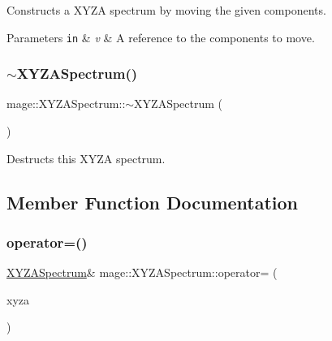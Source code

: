 Constructs a X\+Y\+ZA spectrum by moving the given components.


\begin{DoxyParams}[1]{Parameters}
\mbox{\tt in}  & {\em v} & A reference to the components to move. \\
\hline
\end{DoxyParams}
\hypertarget{structmage_1_1_x_y_z_a_spectrum_ac50d94c9756b6e8c1ff611dc37fbcfbf}{}\label{structmage_1_1_x_y_z_a_spectrum_ac50d94c9756b6e8c1ff611dc37fbcfbf} 
\subsubsection{\texorpdfstring{$\sim$\+X\+Y\+Z\+A\+Spectrum()}{~XYZASpectrum()}}
{\footnotesize\ttfamily mage\+::\+X\+Y\+Z\+A\+Spectrum\+::$\sim$\+X\+Y\+Z\+A\+Spectrum (\begin{DoxyParamCaption}{ }\end{DoxyParamCaption})\hspace{0.3cm}{\ttfamily [default]}}

Destructs this X\+Y\+ZA spectrum. 

\subsection{Member Function Documentation}
\hypertarget{structmage_1_1_x_y_z_a_spectrum_a19cd04808e18b2791307195c54846988}{}\label{structmage_1_1_x_y_z_a_spectrum_a19cd04808e18b2791307195c54846988} 
\subsubsection{\texorpdfstring{operator=()}{operator=()}\hspace{0.1cm}{\footnotesize\ttfamily [1/2]}}
{\footnotesize\ttfamily \hyperlink{structmage_1_1_x_y_z_a_spectrum}{X\+Y\+Z\+A\+Spectrum}\& mage\+::\+X\+Y\+Z\+A\+Spectrum\+::operator= (\begin{DoxyParamCaption}\item[{const \hyperlink{structmage_1_1_x_y_z_a_spectrum}{X\+Y\+Z\+A\+Spectrum} \&}]{xyza }\end{DoxyParamCaption})\hspace{0.3cm}{\ttfamily [default]}}

